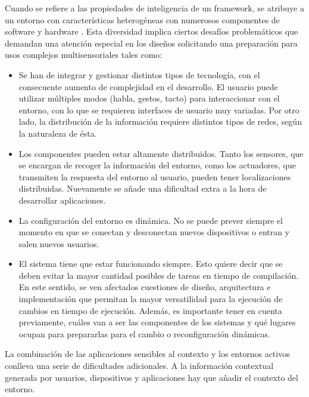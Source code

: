 Cuando se refiere a las propiedades de inteligencia de un framework, se atribuye
a un entorno con características heterogéneas con numerosos
componentes de software y hardware \cite{cap1.133}. Esta diversidad implica
ciertos desafíos problemáticos que demandan una atención especial en los diseños
solicitando una preparación para usos complejos multisensoriales tales como:  

\begin{itemize} 
 
\item
Se han de integrar y gestionar distintos tipos de tecnología, con
el consecuente aumento de complejidad en el desarrollo. El usuario puede
utilizar múltiples modos (habla, gestos, tacto) para interaccionar con
el entorno, con lo que se requieren interfaces de usuario muy variadas. Por
otro lado, la distribución de la información requiere distintos tipos de redes,
según la naturaleza de ésta.

\item
Los componentes pueden estar altamente distribuidos. Tanto los
sensores, que se encargan de recoger la información del entorno, como los
actuadores, que transmiten la respuesta del entorno al usuario, pueden
tener localizaciones distribuidas. Nuevamente se añade una dificultad extra a la
hora de desarrollar aplicaciones.

\item
La configuración del entorno es dinámica. No se puede prever siempre
el momento en que se conectan y desconectan nuevos dispositivos o entran
y salen nuevos usuarios.

\item
El sistema tiene que estar funcionando siempre. Esto quiere decir que se
deben evitar la mayor cantidad posibles de tareas en tiempo de compilación. En
este sentido, se ven afectados cuestiones de diseño, arquitectura e
implementación que permitan la mayor versatilidad para la ejecución de
cambios en tiempo de ejecución. Además, es importante tener en cuenta
previamente, cuáles van a ser las componentes de los sistemas y qué lugares
ocupan para prepararlas para el cambio o reconfiguración dinámicas. 

\end{itemize}

La combinación de las aplicaciones sensibles al contexto y los entornos activos
conlleva una serie de dificultades adicionales. A la información contextual
generada por usuarios, dispositivos y aplicaciones hay que añadir el contexto
del entorno.

